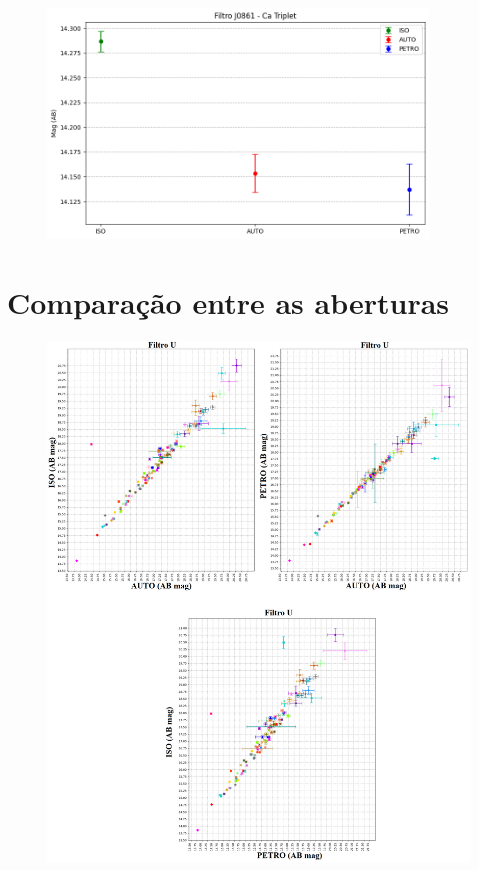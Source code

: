 \begin{anexosenv}
    \begin{figure}[h]
        \centering
        \includegraphics[width=0.9\textwidth]{Imagens/incerteza_abertura_J0861.png} 
        \caption[]{}
        \label{fig:incerteza_abertura_J0861} 
    \end{figure}

\clearpage

\section{Comparação entre as aberturas} \label{sec:comparacao_aberturas}

    \begin{figure}[h]
        \centering
        \includegraphics[width=1.0\textwidth]{Imagens/u_auto_iso.png}
        \caption[]{}
        \label{fig:u_auto_iso} 
    \end{figure}


\end{anexosenv}

